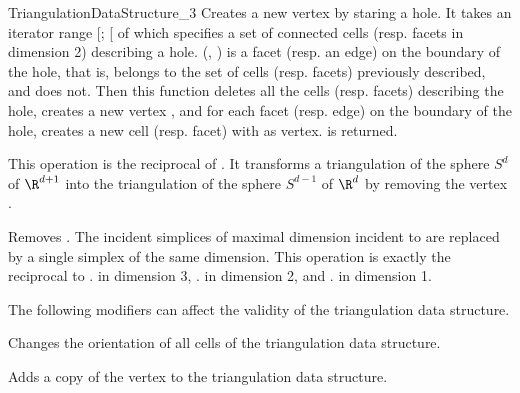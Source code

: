 \begin{ccRefConcept}{TriangulationDataStructure_3}
{Creates a new vertex by staring a hole.  It takes an iterator range
[; [ of  which specifies a set
of connected cells (resp. facets in dimension 2) describing a hole.
(, ) is a facet (resp. an edge) on the boundary of the hole,
that is,  belongs to the set of cells (resp.  facets) previously
described, and  does not.  Then this function deletes
all the cells (resp. facets) describing the hole, creates a new vertex
, and for each facet (resp. edge) on the boundary of the hole, creates
a new cell (resp. facet) with  as vertex.   is returned.
}


{This operation is the reciprocal of .
It transforms a triangulation of the sphere $S^d$ of $\R^{d+1}$ into the
triangulation of the sphere $S^{d-1}$ of $\R^{d}$ by removing the vertex
.
}

{Removes . The incident simplices of maximal dimension incident to
 are replaced by a single simplex of the same dimension. This
operation is exactly the reciprocal to \ccVar. in
dimension 3, \ccVar. in dimension 2, and
\ccVar. in dimension 1.
}


\begin{ccAdvanced}
The following modifiers can affect the validity of the triangulation
data structure.

{Changes the orientation of all cells of the triangulation data structure.
}

{Adds a copy of the vertex  to the triangulation data structure.}


\end{ccAdvanced}
\end{ccRefConcept}
